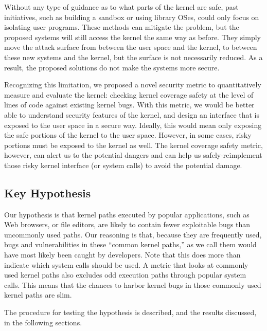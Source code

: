 Without any type of guidance as to what parts of the kernel are safe, past
initiatives, 
such as building a sandbox or using library OSes, could only focus on
isolating user programs.  
These methods can mitigate the problem, but the proposed systems will still
access the kernel the same way as before. 
They simply move the attack surface from between the user space and the
kernel, 
to between these new systems and the kernel, but the surface is not
necessarily reduced. 
As a result, the proposed solutions do not make the systems more secure. 

Recognizing this limitation, we proposed a novel security metric to
quantitatively measure and evaluate the kernel: 
checking kernel coverage safety at the level of lines of code against
existing kernel bugs. 
With this metric, we would be better able to understand security features
of the kernel, 
and design an interface that is exposed to the user space in a secure way.
Ideally, 
this would mean only exposing the safe portions of the kernel to the user
space. 
However, in some cases, risky portions must be exposed to the kernel as
well. 
The kernel coverage safety metric, however, can alert us to the potential
dangers and 
can help us safely-reimplement those risky kernel interface (or system
calls) to avoid the potential damage.










\subsection{Key Hypothesis}

Our hypothesis is that kernel paths executed by popular applications, 
such as Web browsers, or file editors, are likely to contain fewer
exploitable bugs 
than uncommonly used paths. Our reasoning is that, because they are
frequently used, 
bugs and vulnerabilities in these ``common kernel paths,'' as we call them 
would have most likely been caught by developers. 
Note that this does more than indicate which system calls should be used. 
A metric that looks at commonly used kernel paths also excludes odd
execution paths 
through popular system calls. 
This means that the chances to harbor kernel bugs in those commonly used
kernel paths are slim. 

The procedure for testing the hypothesis is described, and the results
discussed, in the following sections. 

